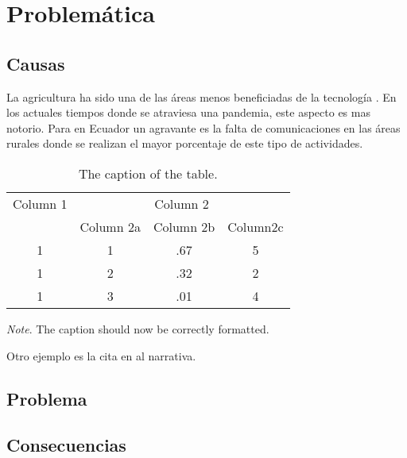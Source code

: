 \chapter{Problemática}
\section{Causas}

La agricultura ha sido una de las áreas menos beneficiadas de la tecnología \citep{espinoza2017tecnologias}. En los actuales tiempos donde se atraviesa una pandemia, este aspecto es mas notorio. Para \citet{sanchez2020arquitectura} en Ecuador un agravante es la falta de comunicaciones en las áreas rurales donde se realizan el mayor porcentaje de este tipo de actividades.
 
\begin{table}[htpb]
\centering
\caption{The caption of the table.}
\begin{tabular}{cccc}

\toprule
Column 1 & \multicolumn{3}{c}{Column 2} \\
& Column 2a & Column 2b & Column2c \\
\midrule
1 & 1 & .67 & 5 \\
1 & 2 & .32 & 2 \\
1 & 3 & .01 & 4 \\
\bottomrule
\end{tabular}

\bigskip
\small\textit{Note}. The caption should now be correctly formatted.
\end{table}




Otro ejemplo es la cita en al narrativa. 
\section{Problema}
\section{Consecuencias}
